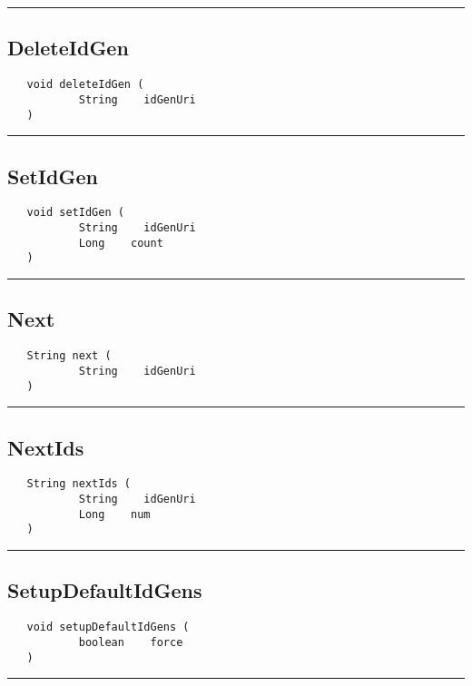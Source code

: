 \rule{15cm}{2pt}
\subsection{DeleteIdGen}
\label{Api:DeleteIdGen}
\begin{verbatim}
   void deleteIdGen (
           String    idGenUri
   )
\end{verbatim}



\rule{15cm}{2pt}
\subsection{SetIdGen}
\label{Api:SetIdGen}
\begin{verbatim}
   void setIdGen (
           String    idGenUri
           Long    count
   )
\end{verbatim}



\rule{15cm}{2pt}
\subsection{Next}
\label{Api:Next}
\begin{verbatim}
   String next (
           String    idGenUri
   )
\end{verbatim}



\rule{15cm}{2pt}
\subsection{NextIds}
\label{Api:NextIds}
\begin{verbatim}
   String nextIds (
           String    idGenUri
           Long    num
   )
\end{verbatim}



\rule{15cm}{2pt}
\subsection{SetupDefaultIdGens}
\label{Api:SetupDefaultIdGens}
\begin{verbatim}
   void setupDefaultIdGens (
           boolean    force
   )
\end{verbatim}



\rule{15cm}{2pt}
